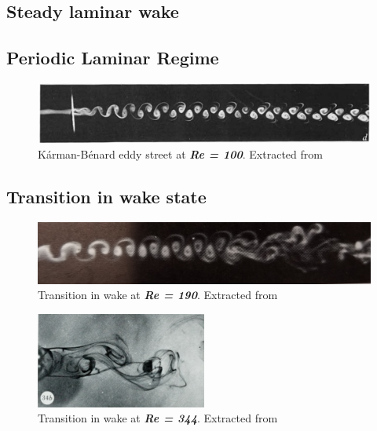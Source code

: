 \documentclass[journal]{new-aiaa}
\begin{document}
\subsection{Steady laminar wake}

\subsection{Periodic Laminar Regime}


\begin{figure}[H]
\begin{center}
\includegraphics[width=1\textwidth]{Images/federico/Figure02}
\caption{Kárman-Bénard eddy street at \textbf{\textit{Re = 100}}. Extracted from \cite{Zdravkovich1968} }
\label{fig:Laminar}
\end{center}
\end{figure}

\subsection{Transition in wake state}

\begin{figure}[H]
\begin{center}
\includegraphics[width=1\textwidth]{Images/federico/Figure03}
\caption{Transition in wake at \textbf{\textit{Re = 190}}. Extracted from \cite{Zdravkovich1968} }
\label{fig:TrW1}
\end{center}
\end{figure}

\begin{figure}[H]
\begin{center}
\includegraphics[width=0.5\textwidth]{Images/federico/Figure04}
\caption{Transition in wake at \textbf{\textit{Re = 344}}. Extracted from \cite{Gerrard1978} }
\label{fig:TrW2}
\end{center}
\end{figure}
\end{document}
